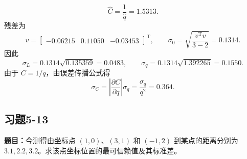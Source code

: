 \documentclass[UTF8,zihao=-4]{ctexart}
\newcommand{\problem}[1]{\subsection*{#1}}
\newcommand{\timu}{\noindent\textbf{题目：}}
\begin{document}
{\begin{equation*}
    \hat{C}=\frac{1}{\hat{q}}=1.5313.
\end{equation*}
残差为
\begin{equation*}
    v=\begin{bmatrix}-0.06215&0.11050&-0.03453\end{bmatrix}^{\mathrm T},
    \qquad
    \sigma_0=\sqrt{\frac{v^{\mathrm T}v}{3-2}}=0.1314.
\end{equation*}
因此
\begin{equation*}
    \sigma_L=0.1314\sqrt{0.135359}=0.0483,
    \qquad
    \sigma_q=0.1314\sqrt{1.392265}=0.1550.
\end{equation*}
由于 $C=1/q$，由误差传播公式得
\begin{equation*}
    \sigma_C=\left|\frac{\partial C}{\partial q}\right|\sigma_q
    =\frac{\sigma_q}{q^2}=0.364.
\end{equation*}

\newpage

\problem{习题5-13}
\timu 今测得由坐标点 $(1,0)$、$(3,1)$ 和 $(-1,2)$ 到某点的距离分别为 $3.1,2.2,3.2$。求该点坐标位置的最可信赖值及其标准差。

}
\end{document}
